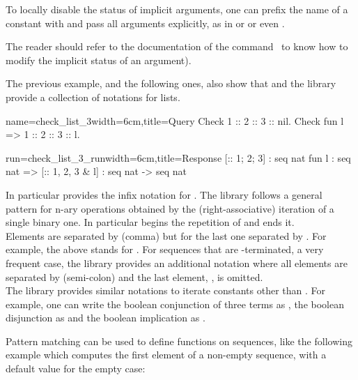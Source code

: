 To locally disable the
status of implicit arguments, one can prefix the name of a
constant with  and pass all arguments explicitly, as in
 or  or even
.

The reader should refer to the documentation of the 
command~\cite{Coq:manual} to know how to modify the implicit 
status of an argument). 

The previous example, and the following ones, also show
that \Coq{} and the \mcbMC{} library provide
a collection of notations for lists.

\begin{coq-left}{name=check_list_3}{width=6cm,title=Query}
Check 1 :: 2 :: 3 :: nil.
Check fun l => 1 :: 2 :: 3 :: l.
$~$
\end{coq-left}
\begin{coqout-right}{run=check_list_3_run}{width=6cm,title=Response}
[:: 1; 2; 3] : seq nat
fun l : seq nat => [:: 1, 2, 3 & l]
  : seq nat -> seq nat
\end{coqout-right}
\index[coq]{\C{[:: .. , .. & ..]}}

In particular \Coq{} provides the infix notation \C{::} for
.  The \mcbMC{} library follows a general pattern for
n-ary operations obtained by the (right-associative)
iteration of a single binary one. In
particular \C{[::} begins the repetition
of \C{::} and \C{]} ends it.\\
Elements are separated by \C{,} (comma)
but for the last one separated by \C{&}.
For example, the above \C{[:: 1, 2, 3 & l]} stands for
.
For sequences that are -terminated, a very frequent case,
the \mcbMC{} library provides an additional notation where all elements are
separated by \C{;} (semi-colon) and the last element, ,
is omitted.
\index[coq]{\C{[seq .. ; ..]}}\\
The \mcbMC{} library provides similar notations 
to iterate constants other than .
For example, one can write  the boolean conjunction
of three terms as , the 
boolean disjunction as \C{[|| b1, b2 | b3]} and the boolean
implication as \C{[==> b1, b2 => b3]}.
\index[coq]{\C{["|"| .. , .. "| ..]}}
\index[coq]{\C{[&& .. , .. & ..]}}
\index[coq]{\C{[==> .. , .. => ..]}}

Pattern matching can be used to define functions on sequences, like
the following example which computes the first element of a non-empty
sequence, with a default value for the empty case:

